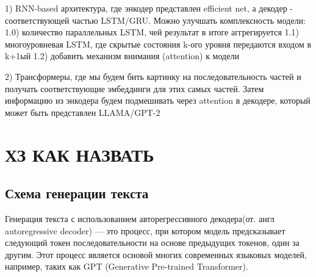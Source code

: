 \documentclass[a4paper,12pt]{extarticle}
\begin{document}
1) RNN-based архитектура, где энкодер представлен efficient net, а декодер - соответствующей частью LSTM/GRU.
Можно улучшать комплексность модели: 
1.0) количество параллельных LSTM, чей результат в итоге аггрегируется
1.1) многоуровневая LSTM, где скрытые состояния k-ого уровня передаются входом в k+1ый
1.2) добавить механизм внимания (attention) к модели

2) Трансформеры, где мы будем бить картинку на последовательность частей и получать соответствующие эмбеддинги для этих самых частей. Затем информацию из энкодера будем подмешивать через attention в декодере, который может быть представлен LLAMA/GPT-2

\newpage
\section{ХЗ КАК НАЗВАТЬ}

\subsection{Схема генерации текста}

Генерация текста с использованием авторегрессивного декодера(от. англ autoregressive decoder) — это процесс, при котором модель предсказывает следующий токен последовательности на основе предыдущих токенов, один за другим. Этот процесс является основой многих современных языковых моделей, например, таких как GPT (Generative Pre-trained Transformer).
\end{document}
